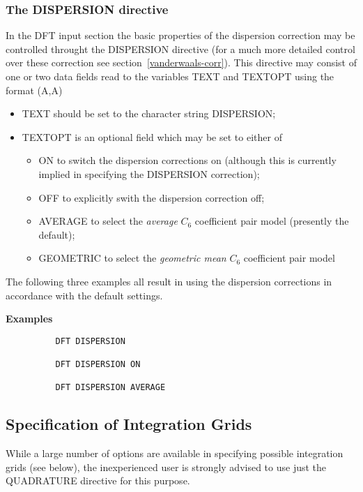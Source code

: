 \documentclass[11pt,fleqn]{article}
\begin{document}
\subsubsection{The DISPERSION directive}

In the DFT input section the basic properties of the dispersion correction may
be controlled throught the DISPERSION directive
(for a much more detailed control over these correction see 
section~\ref{vanderwaals-corr}). This directive may consist of
one or two data fields read to the variables TEXT and TEXTOPT using the format
(A,A)
\begin{itemize}
\item TEXT should be set to the character string DISPERSION;
\item TEXTOPT is an optional field which may be set to either of
      \begin{itemize} 
      \item ON to switch the dispersion corrections on (although this is 
            currently implied in specifying the DISPERSION correction);
      \item OFF to explicitly swith the dispersion correction off;
      \item AVERAGE to select the {\em average} $C_6$ coefficient pair model
            (presently the default);
      \item GEOMETRIC to select the {\em geometric mean} $C_6$ coefficient
            pair model
      \end{itemize}
\end{itemize}
The following three examples all result in using the dispersion corrections
in accordance with the default settings.

{\bf Examples}

{
\footnotesize
\begin{verbatim}
          DFT DISPERSION

          DFT DISPERSION ON

          DFT DISPERSION AVERAGE
\end{verbatim}
}


\subsection{Specification of Integration Grids}

While a large number of options are available in specifying possible
integration grids (see below), the inexperienced user is strongly
advised to use just the QUADRATURE directive for this purpose.
\end{document}
